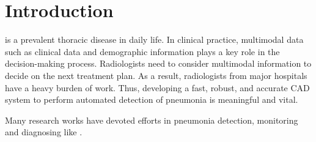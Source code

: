 \documentclass[journal]{IEEEtran}
\begin{document}
%
\IEEEpeerreviewmaketitle

\section{Introduction}
\label{intro}
% 
% 
% 
% 

 is a prevalent thoracic disease in daily life. In clinical practice, multimodal data such as clinical data and demographic information plays a key role in the decision-making process. Radiologists need to consider multimodal information to decide on the next treatment plan. As a result, radiologists from major hospitals have a heavy burden of work. Thus, developing a fast, robust, and accurate CAD system to perform automated detection of pneumonia is meaningful and vital. 

Many research works have devoted efforts in pneumonia detection, monitoring and diagnosing like \cite{Shin2016Learning, deepika2018classification, iakovidis2012image}.
\end{document}
